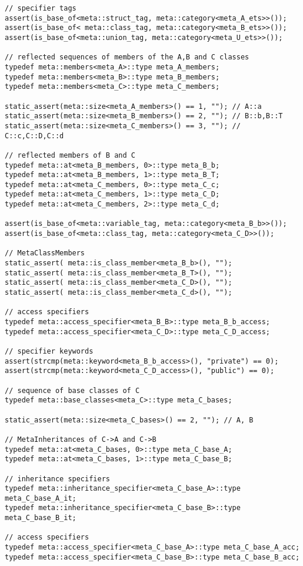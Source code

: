 \begin{verbatim}
// specifier tags
assert(is_base_of<meta::struct_tag, meta::category<meta_A_ets>>());
assert(is_base_of< meta::class_tag, meta::category<meta_B_ets>>());
assert(is_base_of<meta::union_tag, meta::category<meta_U_ets>>());

// reflected sequences of members of the A,B and C classes
typedef meta::members<meta_A>::type meta_A_members;
typedef meta::members<meta_B>::type meta_B_members;
typedef meta::members<meta_C>::type meta_C_members;

static_assert(meta::size<meta_A_members>() == 1, ""); // A::a
static_assert(meta::size<meta_B_members>() == 2, ""); // B::b,B::T
static_assert(meta::size<meta_C_members>() == 3, ""); // C::c,C::D,C::d

// reflected members of B and C
typedef meta::at<meta_B_members, 0>::type meta_B_b;
typedef meta::at<meta_B_members, 1>::type meta_B_T;
typedef meta::at<meta_C_members, 0>::type meta_C_c;
typedef meta::at<meta_C_members, 1>::type meta_C_D;
typedef meta::at<meta_C_members, 2>::type meta_C_d;

assert(is_base_of<meta::variable_tag, meta::category<meta_B_b>>());
assert(is_base_of<meta::class_tag, meta::category<meta_C_D>>());

// MetaClassMembers
static_assert( meta::is_class_member<meta_B_b>(), "");
static_assert( meta::is_class_member<meta_B_T>(), "");
static_assert( meta::is_class_member<meta_C_D>(), "");
static_assert( meta::is_class_member<meta_C_d>(), "");

// access specifiers
typedef meta::access_specifier<meta_B_B>::type meta_B_b_access;
typedef meta::access_specifier<meta_C_D>::type meta_C_D_access;

// specifier keywords
assert(strcmp(meta::keyword<meta_B_b_access>(), "private") == 0);
assert(strcmp(meta::keyword<meta_C_D_access>(), "public") == 0);

// sequence of base classes of C
typedef meta::base_classes<meta_C>::type meta_C_bases;

static_assert(meta::size<meta_C_bases>() == 2, ""); // A, B

// MetaInheritances of C->A and C->B
typedef meta::at<meta_C_bases, 0>::type meta_C_base_A;
typedef meta::at<meta_C_bases, 1>::type meta_C_base_B;

// inheritance specifiers
typedef meta::inheritance_specifier<meta_C_base_A>::type meta_C_base_A_it;
typedef meta::inheritance_specifier<meta_C_base_B>::type meta_C_base_B_it;

// access specifiers
typedef meta::access_specifier<meta_C_base_A>::type meta_C_base_A_acc;
typedef meta::access_specifier<meta_C_base_B>::type meta_C_base_B_acc;


\end{verbatim}
